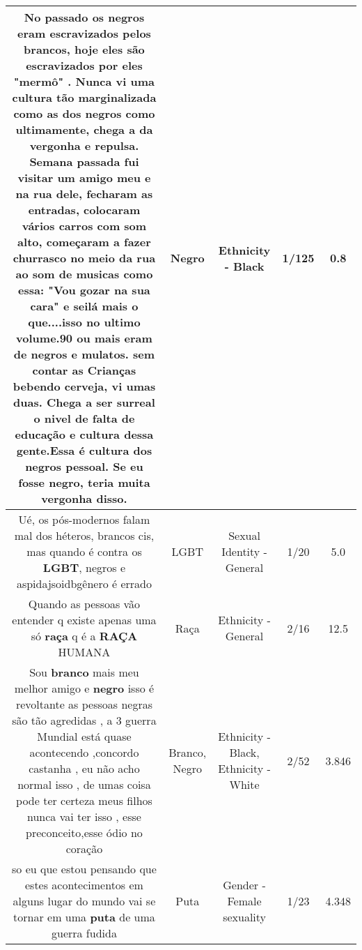 \documentclass[11pt]{article}
\newlength\mylength
\begin{document}
\begin{center}
\begin{longtable}{|C{.65\mylength}|C{.30\mylength}|C{.12\mylength}|C{.12\mylength}|C{.12\mylength}|}
  \small No passado os negros eram escravizados pelos brancos, hoje eles são escravizados por eles "mermô" . Nunca vi uma cultura tão marginalizada como as dos negros como ultimamente, chega a da vergonha e repulsa. Semana passada fui visitar um amigo meu  e na rua dele, fecharam as entradas, colocaram vários carros com som alto, começaram a fazer churrasco no meio da rua ao som de musicas como essa: "Vou gozar na sua cara" e  seilá mais o que....isso no ultimo volume.90 ou mais eram de negros e mulatos. sem contar as Crianças bebendo cerveja, vi umas duas.  Chega a ser surreal o nivel de falta de educação e cultura dessa gente.Essa é cultura dos negros pessoal. Se eu fosse \textbf{negro}, teria muita vergonha disso.\normalsize   & Negro & Ethnicity - Black & 1/125 & 0.8 \\  \hline
  \small Ué, os pós-modernos falam mal dos héteros, brancos cis, mas quando é contra os \textbf{LGBT}, negros e aspidajsoidbgênero é errado\normalsize   & LGBT & Sexual Identity - General & 1/20 & 5.0 \\  \hline
  \small Quando as pessoas vão entender q existe apenas uma só \textbf{raça} q é a \textbf{RAÇA} HUMANA\normalsize   & Raça & Ethnicity - General & 2/16 & 12.5 \\  \hline
  \small Sou \textbf{branco} mais meu melhor amigo e \textbf{negro} isso é revoltante as pessoas negras são tão agredidas , a 3 guerra Mundial está quase acontecendo ,concordo castanha , eu não acho normal isso , de umas coisa pode ter certeza meus filhos nunca vai ter isso , esse preconceito,esse ódio no coração\normalsize   & Branco, Negro & Ethnicity - Black, Ethnicity - White & 2/52 & 3.846 \\  \hline
  \small so eu que estou pensando que estes acontecimentos em alguns lugar do mundo vai se tornar em uma \textbf{puta} de uma guerra fudida\normalsize   & Puta & Gender - Female sexuality & 1/23 & 4.348 \\  \hline

\end{longtable}
\end{center}
\end{document}
